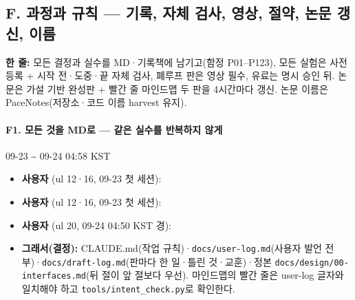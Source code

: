 \subsection{F. 과정과 규칙 --- 기록, 자체 검사, 영상, 절약, 논문 갱신, 이름}\label{rec:F}
\noindent\textbf{한 줄:} 모든 결정과 실수를 MD·기록책에 남기고(함정 P01--P123), 모든 실험은 사전 등록 + 시작 전·도중·끝 자체 검사, 폐루프 판은 영상 필수, 유료는 명시 승인 뒤. 논문은 가설 기반 완성판 + 빨간 줄 마인드맵 두 판을 4시간마다 갱신. 논문 이름은 PaceNotes(저장소·코드 이름 harvest 유지).

\paragraph{F1. 모든 것을 MD로 --- 같은 실수를 반복하지 않게}
{\small 09-23 \textasciitilde{} 09-24 04:58 KST}
\begin{itemize}
  \item \textbf{사용자} (ul 12·16, 09-23 첫 세션): 
  \item \textbf{사용자} (ul 12·16, 09-23 첫 세션): 
  \item \textbf{사용자} (ul 20, 09-24 04:50 KST 경): 
  \item \textbf{그래서(결정):} CLAUDE.md(작업 규칙)·\texttt{docs/\allowbreak{}user-\allowbreak{}log.\allowbreak{}md}(사용자 발언 전부)·\texttt{docs/\allowbreak{}draft-\allowbreak{}log.\allowbreak{}md}(판마다 한 일·틀린 것·교훈)·정본 \texttt{docs/\allowbreak{}design/\allowbreak{}00-\allowbreak{}interfaces.\allowbreak{}md}(뒤 절이 앞 절보다 우선). 마인드맵의 빨간 줄은 user-log 글자와 일치해야 하고 \texttt{tools/\allowbreak{}intent\_\allowbreak{}check.\allowbreak{}py}로 확인한다.
\end{itemize}

